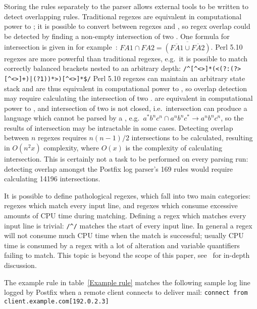 \documentclass{svmult}
\newcommand{\refwithlabel}[2]{%
    #1~\vref{#2}%
}
\newcommand{\tableref}[1]{%
    \refwithlabel{table}{#1}%
}
\newcommand{\tab}[0]{%
    \hspace*{2em}%
}
\newcommand{\numberOFrules}[0]{%
    169%
}
\newcommand{\numberOFruleINTERSECTIONS}[0]{%
    14196%
}
\begin{document}
Storing the rules separately to the parser allows external tools to be
written to detect overlapping rules.  Traditional regexes are equivalent in
computational power to \FA{}; it is possible to convert between regexes and
\FA{}, so regex overlap could be detected by finding a non-empty
intersection of two \FA{}\@.  One formula for \FA{} intersection is given
in for example~\cite{intersection-of-NFA-using-Z}: $FA1 \cap{} FA2 =
\overline{(\overline{FA1} \cup{} \overline{FA2})}$.  Perl 5.10 regexes are
more powerful than traditional regexes, e.g.\ it is possible to match
correctly balanced brackets nested to an arbitrary depth:
\newline{}\tab{}\verb!/^[^<>]*(<(?:(?>[^<>]+)|(?1))*>)[^<>]*$/!\newline{}
Perl 5.10 regexes can maintain an arbitrary state stack and are thus
equivalent in computational power to \PDA{}, so overlap detection may
require calculating the intersection of two \PDA{}\@.  \CFL{} are
equivalent in computational power to \PDA{}, and intersection of two
 is not closed, i.e.\ intersection can produce a language which
cannot be parsed by a \CFL{}, e.g.\ $a^{*}b^{n}c^{n} \cap a^{n}b^{n}c^{*}
\rightarrow a^{n}b^{n}c^{n}$, so the results of \PDA{} intersection may be
intractable in some cases.  Detecting overlap between $n$ regexes requires
$n(n-1)/2$ intersections to be calculated, resulting in $O(n^2x)$
complexity, where $O(x)$ is the complexity of calculating intersection.
This is certainly not a task to be performed on every parsing run:
detecting overlap amongst the Postfix log parser's \numberOFrules{} rules
would require calculating \numberOFruleINTERSECTIONS{} intersections.

It is possible to define pathological regexes, which fall into two main
categories: regexes which match every input line, and regexes which consume
excessive amounts of CPU time during matching.  Defining a regex which
matches every input line is trivial: \verb!/^/! matches the start of every
input line.  In general a regex will not consume much CPU time when the
match is successful; usually CPU time is consumed by a regex with a lot of
alteration and variable quantifiers failing to match.  This topic is beyond
the scope of this paper, see~\cite{mastering-regular-expressions} for
in-depth discussion.

The example rule in \tableref{Example rule} matches the following sample
log line logged by Postfix when a remote client connects to deliver mail:
\newline{}\tab{}\verb!connect from client.example.com[192.0.2.3]!
\end{document}
